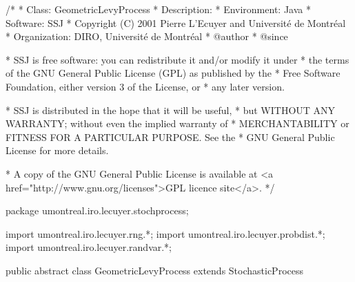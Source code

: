 \begin{code}
\begin{hide}
/*
 * Class:        GeometricLevyProcess
 * Description:  
 * Environment:  Java
 * Software:     SSJ 
 * Copyright (C) 2001  Pierre L'Ecuyer and Université de Montréal
 * Organization: DIRO, Université de Montréal
 * @author       
 * @since

 * SSJ is free software: you can redistribute it and/or modify it under
 * the terms of the GNU General Public License (GPL) as published by the
 * Free Software Foundation, either version 3 of the License, or
 * any later version.

 * SSJ is distributed in the hope that it will be useful,
 * but WITHOUT ANY WARRANTY; without even the implied warranty of
 * MERCHANTABILITY or FITNESS FOR A PARTICULAR PURPOSE.  See the
 * GNU General Public License for more details.

 * A copy of the GNU General Public License is available at
   <a href="http://www.gnu.org/licenses">GPL licence site</a>.
 */
\end{hide}
package umontreal.iro.lecuyer.stochprocess;\begin{hide}
import umontreal.iro.lecuyer.rng.*;
import umontreal.iro.lecuyer.probdist.*;
import umontreal.iro.lecuyer.randvar.*;

\end{hide}

public abstract class GeometricLevyProcess extends StochasticProcess \begin{hide} {

    protected StochasticProcess levyProcess;
    protected double omegaRiskNeutralCorrection;
    protected double muGeom;  // usually the interest rate
    protected double[] muGeomRNdt; // risk neutral corrected 
    protected double[] muGeomRNdT; // risk neutral corrected, from time t0.

    protected void init()
    {
        super.init();
        if (observationTimesSet)
        {
            // Telling the variance gamma proc. about the observ. times
            levyProcess.setObservationTimes (t, d);

            // We need to know in which order the observations are generated
            this.observationIndexFromCounter 
                = levyProcess.getArrayMappingCounterToIndex();

            muGeomRNdt = new double[d];
            for (int i = 0; i < d; i++){
                muGeomRNdt[i] = (muGeom-omegaRiskNeutralCorrection) * 
                                (t[i+1] - t[i]);
            }
            muGeomRNdT = new double[d+1];
            for (int i = 0; i <= d; i++){
                muGeomRNdT[i] = (muGeom-omegaRiskNeutralCorrection) * 
                                (t[i] - t[0]);                
            }
        }
    }
\end{hide}
\end{code}
